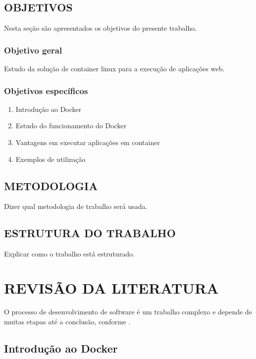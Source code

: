 \documentclass[
	12pt,				%
	openright,			%
	oneside,			%
	a4paper,			%
	chapter=TITLE,		%
	section=TITLE,		%
	english,			%
	french,				%
	spanish,			%
	brazil				%
	]{abntex2}
\begin{document}
\section{OBJETIVOS}

Nesta seção são apresentados os objetivos do presente trabalho.

\subsection{Objetivo geral}

Estudo da solução de container linux para a execução de aplicações web.

\subsection{Objetivos específicos}

\begin{enumerate}
	\item{Introdução ao Docker}
	\item{Estudo do funcionamento do Docker}
	\item{Vantagens em executar aplicações em container}
	\item{Exemplos de utilização}
\end{enumerate}

\section{METODOLOGIA}

Dizer qual metodologia de trabalho será usada.

\section{ESTRUTURA DO TRABALHO}

Explicar como o trabalho está estruturado.

\chapter{REVISÃO DA LITERATURA}\label{cap-revisao}

O processo de desenvolvimento de software é um trabalho complexo e depende de muitas etapas até a conclusão, conforme .

\section{Introdução ao Docker}
\end{document}
